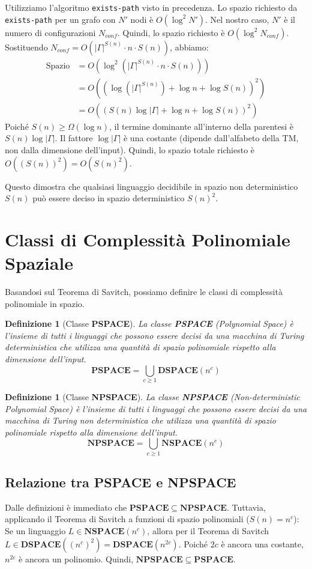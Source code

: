 \documentclass[a4paper, 11pt]{book} %
\newtheorem{definition}[theorem]{Definizione}
\theoremstyle{definition}
\begin{document}
\begin{enumerate}
    Utilizziamo l'algoritmo \texttt{exists-path} visto in precedenza. Lo spazio richiesto da \texttt{exists-path} per un grafo con $N'$ nodi è $O(\log^2 N')$.
    Nel nostro caso, $N'$ è il numero di configurazioni $N_{conf}$.
    Quindi, lo spazio richiesto è $O(\log^2 N_{conf})$.
    Sostituendo $N_{conf} = O(|\Gamma|^{S(n)} \cdot n \cdot S(n))$, abbiamo:
    \begin{align*} \text{Spazio} &= O(\log^2 (|\Gamma|^{S(n)} \cdot n \cdot S(n))) \\ &= O((\log (|\Gamma|^{S(n)}) + \log n + \log S(n))^2) \\ &= O((S(n)\log|\Gamma| + \log n + \log S(n))^2)\end{align*}
    Poiché $S(n) \ge \Omega(\log n)$, il termine dominante all'interno della parentesi è $S(n)\log|\Gamma|$.
    Il fattore $\log|\Gamma|$ è una costante (dipende dall'alfabeto della TM, non dalla dimensione dell'input).
    Quindi, lo spazio totale richiesto è $O((S(n))^2) = O(S(n)^2)$.
\end{enumerate}
Questo dimostra che qualsiasi linguaggio decidibile in spazio non deterministico $S(n)$ può essere deciso in spazio deterministico $S(n)^2$.

\section{Classi di Complessità Polinomiale Spaziale}
Basandosi sul Teorema di Savitch, possiamo definire le classi di complessità polinomiale in spazio.

\begin{definition}[Classe \textbf{PSPACE}]
La classe \textbf{PSPACE} (Polynomial Space) è l'insieme di tutti i linguaggi che possono essere decisi da una macchina di Turing deterministica che utilizza una quantità di spazio polinomiale rispetto alla dimensione dell'input.
\[ \mathbf{PSPACE} = \bigcup_{c \ge 1} \mathbf{DSPACE}(n^c) \]
\end{definition}

\begin{definition}[Classe \textbf{NPSPACE}]
La classe \textbf{NPSPACE} (Non-deterministic Polynomial Space) è l'insieme di tutti i linguaggi che possono essere decisi da una macchina di Turing non deterministica che utilizza una quantità di spazio polinomiale rispetto alla dimensione dell'input.
\[ \mathbf{NPSPACE} = \bigcup_{c \ge 1} \mathbf{NSPACE}(n^c) \]
\end{definition}

\subsection{Relazione tra PSPACE e NPSPACE}
Dalle definizioni è immediato che $\mathbf{PSPACE} \subseteq \mathbf{NPSPACE}$.
Tuttavia, applicando il Teorema di Savitch a funzioni di spazio polinomiali ($S(n) = n^c$):
Se un linguaggio $L \in \mathbf{NSPACE}(n^c)$, allora per il Teorema di Savitch $L \in \mathbf{DSPACE}((n^c)^2) = \mathbf{DSPACE}(n^{2c})$. Poiché $2c$ è ancora una costante, $n^{2c}$ è ancora un polinomio.
Quindi, $\mathbf{NPSPACE} \subseteq \mathbf{PSPACE}$.
\end{document}
